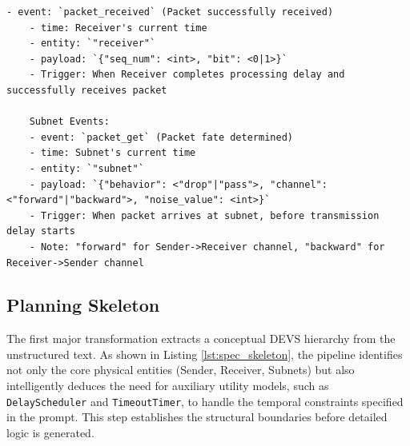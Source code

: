 \begin{lstlisting}[caption={Operational Specification}]
    - event: `packet_received` (Packet successfully received)
    - time: Receiver's current time
    - entity: `"receiver"`
    - payload: `{"seq_num": <int>, "bit": <0|1>}`
    - Trigger: When Receiver completes processing delay and successfully receives packet
    
    Subnet Events:
    - event: `packet_get` (Packet fate determined)
    - time: Subnet's current time
    - entity: `"subnet"`
    - payload: `{"behavior": <"drop"|"pass">, "channel": <"forward"|"backward">, "noise_value": <int>}`
    - Trigger: When packet arrives at subnet, before transmission delay starts
    - Note: "forward" for Sender->Receiver channel, "backward" for Receiver->Sender channel
\end{lstlisting}

\subsection{Planning Skeleton}\label{app:planning_skeleton_artifact}

The first major transformation extracts a conceptual DEVS hierarchy from the unstructured text. As shown in Listing \ref{lst:spec_skeleton}, the pipeline identifies not only the core physical entities (Sender, Receiver, Subnets) but also intelligently deduces the need for auxiliary utility models, such as \texttt{DelayScheduler} and \texttt{TimeoutTimer}, to handle the temporal constraints specified in the prompt. This step establishes the structural boundaries before detailed logic is generated.

